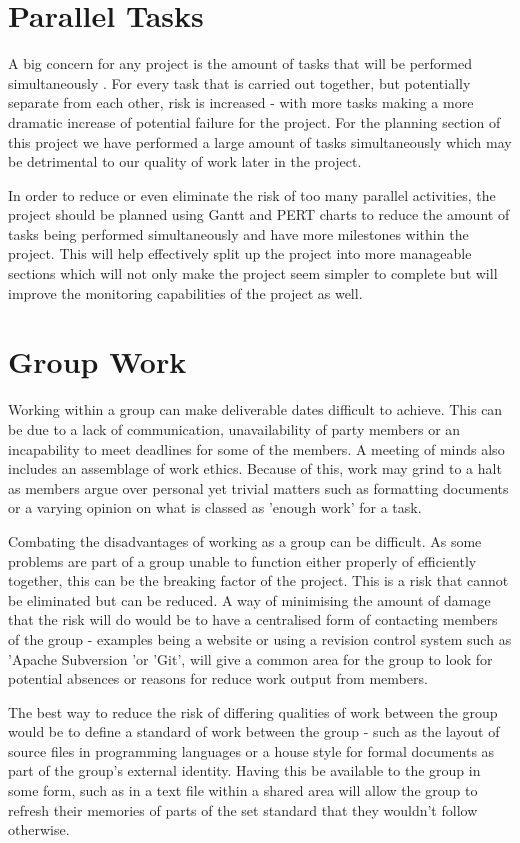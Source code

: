 \section{Parallel Tasks}
A big concern for any project is the amount of tasks that will be performed
simultaneously \cite{OracleWP}.
For every task that is carried out together, but potentially
separate from each other, risk is increased - with more tasks making a more
dramatic increase of potential failure for the project.  For the planning
section of this project we have performed a large amount of tasks simultaneously
which may be detrimental to our quality of work later in the project.

In order to reduce or even eliminate the risk of too many parallel activities,
the project should be planned using Gantt and PERT charts to reduce the amount
of tasks being performed simultaneously and have more milestones within the
project.  This will help effectively split up the project into more manageable
sections which will not only make the project seem simpler to complete but will
improve the monitoring capabilities of the project as well.

\section{Group Work}
Working within a group can make deliverable dates difficult to achieve.  This
can be due to a lack of communication, unavailability of party members or an
incapability to meet deadlines for some of the members.  A meeting of minds also
includes an assemblage of work ethics.  Because of this, work may grind to a
halt as members argue over personal yet trivial matters such as formatting
documents or a varying opinion on what is classed as 'enough work' for a task.

Combating the disadvantages of working as a group can be difficult.  As some
problems are part of a group unable to function either properly of efficiently
together, this can be the breaking factor of the project.  This is a risk that
cannot be eliminated but can be reduced.  A way of minimising the amount of
damage that the risk will do would be to have a centralised form of contacting
members of the group - examples being a website or using a revision control
system such as 'Apache Subversion 'or 'Git', will give a common area for the
group to look for potential absences or reasons for reduce work output from
members. 

The best way to reduce the risk of differing qualities of work between the group
would be to define a standard of work between the group - such as the layout of
source files in programming languages or a house style for formal documents as
part of the group's external identity.  Having this be available to the group in
some form, such as in a text file within a shared area will allow the group to
refresh their memories of parts of the set standard that they wouldn't follow
otherwise.


